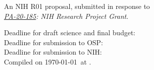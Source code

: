 \maketitle

\begin{center}
An NIH R01 proposal, submitted in response to \\
{\em \href{https://grants.nih.gov/grants/guide/pa-files/PA-20-185.html}{PA-20-185}: NIH Research Project Grant}.
\end{center}

\vfill

\noindent
Deadline for draft science and final budget: \\
Deadline for submission to OSP: \\
Deadline for submission to NIH: \\

{\scriptsize Compiled on \today\ at \currenttime.}
